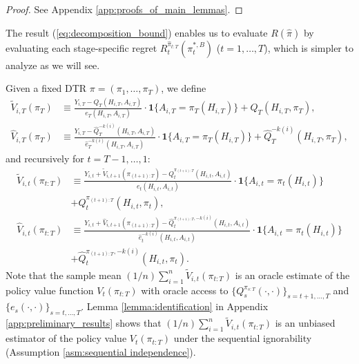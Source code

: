 \begin{proof}
See Appendix \ref{app:proofs_of_main_lemmas}.
\end{proof}

\medskip
The result (\ref{eq:decomposition_bound}) enables us to evaluate $R(\hat{\pi})$ by evaluating each stage-specific regret $R_{t}^{\hat{\pi}_{t:T}}(\pi_{t}^{\ast,B})$ ($t=1,\ldots,T$), which is simpler to analyze as we will see.

Given a fixed DTR $\pi=(\pi_1,\ldots,\pi_T)$, we define
\begin{align*}
\widetilde{V}_{i,T}(\pi_{T}) &\equiv \frac{ Y_{i,T} - Q_{T}(H_{i,T},A_{i,T}) }{e_{T}(H_{i,T},A_{i,T})}\cdot \mathbf{1}\{A_{i,T}=\pi_{T}(H_{i,T})\} + Q_{T}(H_{i,T},\pi_{T}),\\
\widehat{V}_{i,T}(\pi_T) &\equiv \frac{ Y_{i,T}- \widehat{Q}_{T}^{-k(i)}(H_{i,T},A_{i,T}) }{\hat{e}_{T}^{-k(i)}(H_{i,T},A_{i,T})}\cdot\mathbf{1}\{A_{i,T} = \pi_{T}(H_{i,T})\} 
+  \widehat{Q}_{T}^{-k(i)}\left(H_{i,T},\pi_{T}\right),
\end{align*}
and recursively for $t=T-1,\ldots,1$:
\begin{align}
\widetilde{V}_{i,t}(\pi_{t:T}) &\equiv \frac{ Y_{i,t} + \widetilde{V}_{i,t+1}(\pi_{(t+1):T}) - Q_{t}^{\pi_{(t+1):T}}(H_{i,t},A_{i,t}) }{e_{t}(H_{i,t},A_{i,t})}\cdot \mathbf{1}\{A_{i,t}=\pi_{t}(H_{i,t})\} \nonumber \\
&+ Q_{t}^{\pi_{(t+1):T}}(H_{i,t},\pi_{t}), \nonumber\\
\widehat{V}_{i,t}(\pi_{t:T}) &\equiv \frac{Y_{i,t} + \widehat{V}_{i,t+1}(\pi_{(t+1):T}) - \widehat{Q}_{t}^{\pi_{(t+1):T},-k(i)}(H_{i,t},A_{i,t}) }{\hat{e}_{t}^{-k(i)}(H_{i,t},A_{i,t})}\cdot \mathbf{1}\{A_{i,t}=\pi_{t}(H_{i,t})\} \nonumber\\
&+ \widehat{Q}_{t}^{\pi_{(t+1):T},-k(i)}(H_{i,t},\pi_{t}). \label{eq:definition_hat_V}
\end{align}
Note that the sample mean $(1/n)\sum_{i=1}^{n}\widetilde{V}_{i,t}\left(\pi_{t:T}\right)$ is an oracle estimate of the policy value function $V_{t}(\pi_{t:T})$ with oracle access to $\{Q_{s}^{\pi_{s:T}}(\cdot,\cdot)\}_{s=t+1,\ldots,T}$ and $\{e_{s}(\cdot,\cdot)\}_{s=t,\ldots,T}$. Lemma \ref{lemma:identification} in Appendix \ref{app:preliminary_results} shows that $(1/n)\sum_{i=1}^{n}\widetilde{V}_{i,t}\left(\pi_{t:T}\right)$ is an unbiased estimator of the policy value $V_{t}(\pi_{t:T})$ under the sequential ignorability (Assumption \ref{asm:sequential independence}).


